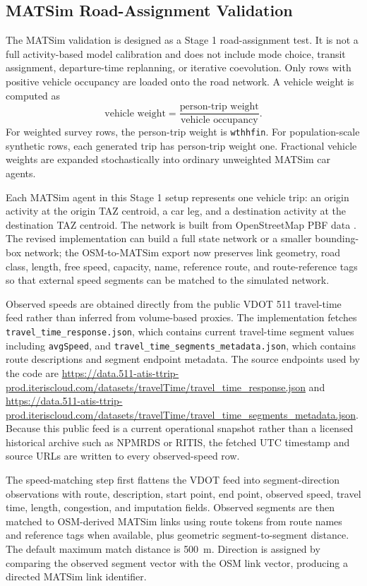 \documentclass[3p,times,procedia]{elsarticle}
\begin{document}
\subsection{MATSim Road-Assignment Validation}
The MATSim validation is designed as a Stage 1 road-assignment test. It is not a full activity-based model calibration and does not include mode choice, transit assignment, departure-time replanning, or iterative coevolution. Only rows with positive vehicle occupancy are loaded onto the road network. A vehicle weight is computed as
\[
\text{vehicle weight}=\frac{\text{person-trip weight}}{\text{vehicle occupancy}}.
\]
For weighted survey rows, the person-trip weight is \texttt{wthhfin}. For population-scale synthetic rows, each generated trip has person-trip weight one. Fractional vehicle weights are expanded stochastically into ordinary unweighted MATSim car agents.

Each MATSim agent in this Stage 1 setup represents one vehicle trip: an origin activity at the origin TAZ centroid, a car leg, and a destination activity at the destination TAZ centroid. The network is built from OpenStreetMap PBF data \cite{openstreetmapOpenStreetMap}. The revised implementation can build a full state network or a smaller bounding-box network; the OSM-to-MATSim export now preserves link geometry, road class, length, free speed, capacity, name, reference route, and route-reference tags so that external speed segments can be matched to the simulated network.

Observed speeds are obtained directly from the public VDOT 511 travel-time feed rather than inferred from volume-based proxies. The implementation fetches \texttt{travel\_time\_response.json}, which contains current travel-time segment values including \texttt{avgSpeed}, and \texttt{travel\_time\_segments\_metadata.json}, which contains route descriptions and segment endpoint metadata. The source endpoints used by the code are \url{https://data.511-atis-ttrip-prod.iteriscloud.com/datasets/travelTime/travel_time_response.json} and \url{https://data.511-atis-ttrip-prod.iteriscloud.com/datasets/travelTime/travel_time_segments_metadata.json}. Because this public feed is a current operational snapshot rather than a licensed historical archive such as NPMRDS or RITIS, the fetched UTC timestamp and source URLs are written to every observed-speed row.

The speed-matching step first flattens the VDOT feed into segment-direction observations with route, description, start point, end point, observed speed, travel time, length, congestion, and imputation fields. Observed segments are then matched to OSM-derived MATSim links using route tokens from route names and reference tags when available, plus geometric segment-to-segment distance. The default maximum match distance is \SI{500}{m}. Direction is assigned by comparing the observed segment vector with the OSM link vector, producing a directed MATSim link identifier.
\end{document}
